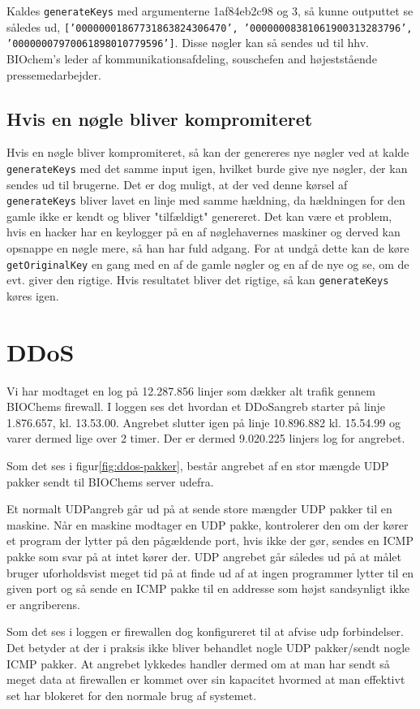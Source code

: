 \documentclass[10pt,a4paper,danish]{article}
\begin{document}
Kaldes \texttt{generateKeys} med argumenterne 1af84eb2c98 og 3, så kunne
outputtet se således ud, \texttt{['00000001867731863824306470', '00000008381061900313283796', '00000007970061898010779596']}.
Disse nøgler kan så sendes ud til hhv. BIOchem’s leder af kommunikationsafdeling,
souschefen and højeststående pressemedarbejder.

\subsection{Hvis en nøgle bliver kompromiteret}
Hvis en nøgle bliver kompromiteret, så kan der genereres nye nøgler ved at kalde
\texttt{generateKeys} med det samme input igen, hvilket burde give nye nøgler,
der kan sendes ud til brugerne.
Det er dog muligt, at der ved denne kørsel af \texttt{generateKeys} bliver lavet
en linje med samme hældning, da hældningen for den gamle ikke er kendt og bliver
"tilfældigt" genereret.
Det kan være et problem, hvis en hacker har en keylogger på en af nøglehavernes
maskiner og derved kan opsnappe en nøgle mere, så han har fuld adgang.
For at undgå dette kan de køre \texttt{getOriginalKey} en gang med en af de
gamle nøgler og en af de nye og se, om de evt. giver den rigtige. Hvis resultatet
bliver det rigtige, så kan \texttt{generateKeys} køres igen.

\section{DDoS}
Vi har modtaget en log på 12.287.856 linjer som dækker alt trafik gennem
BIOChems firewall.
I loggen ses det hvordan et DDoSangreb starter på linje 1.876.657, kl. 13.53.00.
Angrebet slutter igen på linje 10.896.882 kl. 15.54.99 og varer dermed lige over 2
timer.
Der er dermed 9.020.225 linjers log for angrebet.

Som det ses i figur\ref{fig:ddos-pakker}, består angrebet af en stor mængde UDP
pakker sendt til BIOChems server udefra.

Et normalt UDPangreb går ud på at sende store mængder UDP pakker til en maskine.
Når en maskine modtager en UDP pakke, kontrolerer den om der kører et program
der lytter på den pågældende port, hvis ikke der gør, sendes en ICMP pakke som
svar på at intet kører der. UDP angrebet går således ud på at målet bruger
uforholdsvist meget tid på at finde ud af at ingen programmer lytter til en
given port og så sende en ICMP pakke til en addresse som højst sandsynligt ikke
er angriberens.

Som det ses i loggen er firewallen dog konfigureret til at afvise udp
forbindelser.
Det betyder at der i praksis ikke bliver behandlet nogle UDP pakker/sendt nogle
ICMP pakker. At angrebet lykkedes handler dermed om at man har sendt så meget
data at firewallen er kommet over sin kapacitet hvormed at man effektivt set har
blokeret for den normale brug af systemet.
\end{document}
